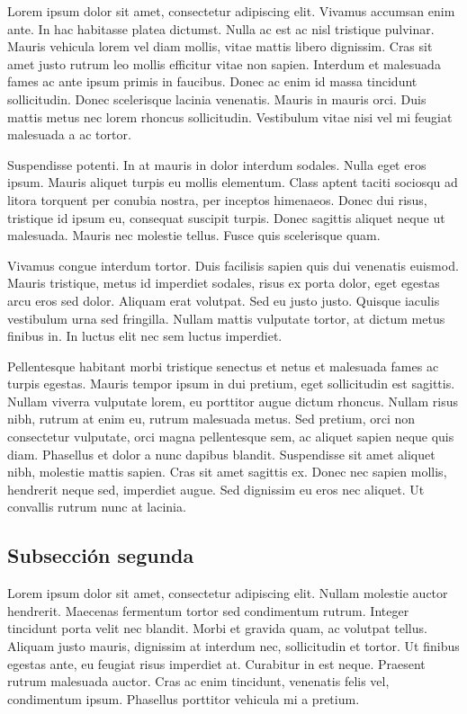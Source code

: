 \documentclass[a4paper, twoside]{article}
\begin{document}
Lorem ipsum dolor sit amet, consectetur adipiscing elit. Vivamus accumsan enim ante. In hac habitasse platea dictumst. Nulla ac est ac nisl tristique pulvinar. Mauris vehicula lorem vel diam mollis, vitae mattis libero dignissim. Cras sit amet justo rutrum leo mollis efficitur vitae non sapien. Interdum et malesuada fames ac ante ipsum primis in faucibus. Donec ac enim id massa tincidunt sollicitudin. Donec scelerisque lacinia venenatis. Mauris in mauris orci. Duis mattis metus nec lorem rhoncus sollicitudin. Vestibulum vitae nisi vel mi feugiat malesuada a ac tortor.

Suspendisse potenti. In at mauris in dolor interdum sodales. Nulla eget eros ipsum. Mauris aliquet turpis eu mollis elementum. Class aptent taciti sociosqu ad litora torquent per conubia nostra, per inceptos himenaeos. Donec dui risus, tristique id ipsum eu, consequat suscipit turpis. Donec sagittis aliquet neque ut malesuada. Mauris nec molestie tellus. Fusce quis scelerisque quam.

Vivamus congue interdum tortor. Duis facilisis sapien quis dui venenatis euismod. Mauris tristique, metus id imperdiet sodales, risus ex porta dolor, eget egestas arcu eros sed dolor. Aliquam erat volutpat. Sed eu justo justo. Quisque iaculis vestibulum urna sed fringilla. Nullam mattis vulputate tortor, at dictum metus finibus in. In luctus elit nec sem luctus imperdiet.

Pellentesque habitant morbi tristique senectus et netus et malesuada fames ac turpis egestas. Mauris tempor ipsum in dui pretium, eget sollicitudin est sagittis. Nullam viverra vulputate lorem, eu porttitor augue dictum rhoncus. Nullam risus nibh, rutrum at enim eu, rutrum malesuada metus. Sed pretium, orci non consectetur vulputate, orci magna pellentesque sem, ac aliquet sapien neque quis diam. Phasellus et dolor a nunc dapibus blandit. Suspendisse sit amet aliquet nibh, molestie mattis sapien. Cras sit amet sagittis ex. Donec nec sapien mollis, hendrerit neque sed, imperdiet augue. Sed dignissim eu eros nec aliquet. Ut convallis rutrum nunc at lacinia. 

\subsection{Subsección segunda}

Lorem ipsum dolor sit amet, consectetur adipiscing elit. Nullam molestie auctor hendrerit. Maecenas fermentum tortor sed condimentum rutrum. Integer tincidunt porta velit nec blandit. Morbi et gravida quam, ac volutpat tellus. Aliquam justo mauris, dignissim at interdum nec, sollicitudin et tortor. Ut finibus egestas ante, eu feugiat risus imperdiet at. Curabitur in est neque. Praesent rutrum malesuada auctor. Cras ac enim tincidunt, venenatis felis vel, condimentum ipsum. Phasellus porttitor vehicula mi a pretium.
\end{document}
